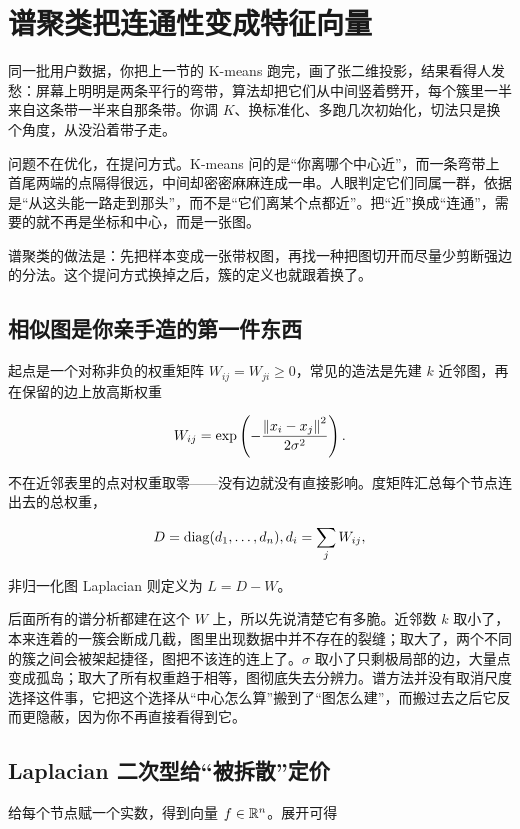 \section{谱聚类把连通性变成特征向量}
\label{sec:13-Machine-Learning/05-Clustering-and-Data-Geometry/02}

同一批用户数据，你把上一节的 K-means 跑完，画了张二维投影，结果看得人发愁：屏幕上明明是两条平行的弯带，算法却把它们从中间竖着劈开，每个簇里一半来自这条带一半来自那条带。你调 \(K\)、换标准化、多跑几次初始化，切法只是换个角度，从没沿着带子走。

问题不在优化，在提问方式。K-means 问的是``你离哪个中心近''，而一条弯带上首尾两端的点隔得很远，中间却密密麻麻连成一串。人眼判定它们同属一群，依据是``从这头能一路走到那头''，而不是``它们离某个点都近''。把``近''换成``连通''，需要的就不再是坐标和中心，而是一张图。

谱聚类的做法是：先把样本变成一张带权图，再找一种把图切开而尽量少剪断强边的分法。这个提问方式换掉之后，簇的定义也就跟着换了。

\subsection{相似图是你亲手造的第一件东西}

起点是一个对称非负的权重矩阵 \(W_{ij}=W_{ji}\ge 0\)，常见的造法是先建 \(k\) 近邻图，再在保留的边上放高斯权重

\[
W_{ij}=\exp\left(-\frac{\left\lVert x_i-x_j\right\rVert^2}{2\sigma^2}\right).
\]

不在近邻表里的点对权重取零——没有边就没有直接影响。度矩阵汇总每个节点连出去的总权重，

\[
D=\operatorname{diag}(d_1,\ldots,d_n),\space d_i=\sum_j W_{ij},
\]

非归一化图 Laplacian 则定义为 \(L=D-W\)。

后面所有的谱分析都建在这个 \(W\) 上，所以先说清楚它有多脆。近邻数 \(k\) 取小了，本来连着的一簇会断成几截，图里出现数据中并不存在的裂缝；取大了，两个不同的簇之间会被架起捷径，图把不该连的连上了。\(\sigma\) 取小了只剩极局部的边，大量点变成孤岛；取大了所有权重趋于相等，图彻底失去分辨力。谱方法并没有取消尺度选择这件事，它把这个选择从``中心怎么算''搬到了``图怎么建''，而搬过去之后它反而更隐蔽，因为你不再直接看得到它。

\subsection{Laplacian 二次型给``被拆散''定价}

给每个节点赋一个实数，得到向量 \(f\in\mathbb{R}^n\)。展开可得


